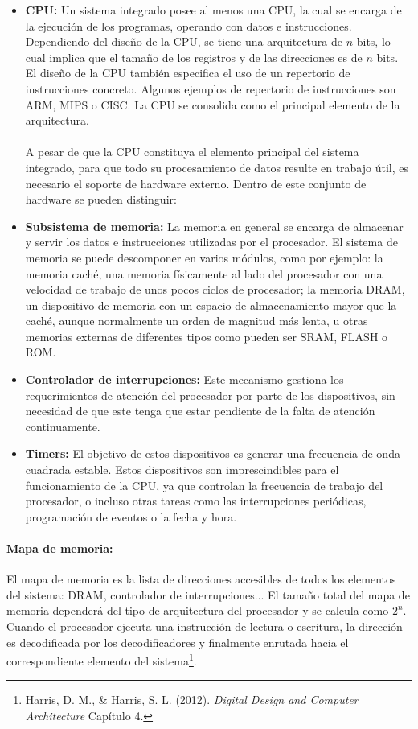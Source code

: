 \begin{itemize}
\item \textbf{CPU:} Un sistema integrado posee al menos una CPU, la cual se encarga de la ejecuci\'on de los programas, operando con datos e instrucciones. Dependiendo del diseño de la CPU, se tiene una arquitectura de $n$ bits, lo cual implica que el tamaño de los registros y de las direcciones es de $n$ bits. El diseño de la CPU también especifica el uso de un repertorio de instrucciones concreto. Algunos ejemplos de repertorio de instrucciones son ARM, MIPS o CISC. La CPU se consolida como el principal elemento de la arquitectura.
\paragraph{}
   A pesar de que la CPU constituya el elemento principal del sistema integrado, para que todo su procesamiento de datos resulte en trabajo \'util, es necesario el soporte de hardware externo. Dentro de este conjunto de hardware se pueden distinguir:
\item \textbf{Subsistema de memoria:} La memoria en general se encarga de almacenar y servir los datos e instrucciones utilizadas por el procesador. El sistema de memoria se puede descomponer en varios m\'odulos, como por ejemplo: la memoria cach\'e, una memoria f\'isicamente al lado del procesador con una velocidad de trabajo de unos pocos ciclos de procesador; la memoria DRAM, un dispositivo de memoria con un espacio de almacenamiento mayor que la cach\'e, aunque normalmente un orden de magnitud m\'as lenta, u otras memorias externas de diferentes tipos como pueden ser SRAM, FLASH o ROM.
\item \textbf{Controlador de interrupciones:} Este mecanismo gestiona los requerimientos de atención del procesador por parte de los dispositivos, sin necesidad de que este tenga que estar pendiente de la falta de atención continuamente.
\item \textbf{Timers:} El objetivo de estos dispositivos es generar una frecuencia de onda cuadrada estable. Estos dispositivos son imprescindibles para el funcionamiento de la CPU, ya que controlan la frecuencia de trabajo del procesador, o incluso otras tareas como las interrupciones periódicas, programación de eventos o la fecha y hora.
\end{itemize}
\paragraph{Mapa de memoria:} El mapa de memoria es la lista de direcciones accesibles de todos los elementos del sistema: DRAM, controlador de interrupciones... El tamaño total del mapa de memoria dependerá del tipo de arquitectura del procesador y se calcula como $2^n$. Cuando el procesador ejecuta una instrucción de lectura o escritura, la dirección es decodificada por los decodificadores y finalmente enrutada hacia el correspondiente elemento del sistema\footnote{Harris, D. M., & Harris, S. L. (2012). \textit{Digital Design and Computer Architecture} Capítulo 4.}.

